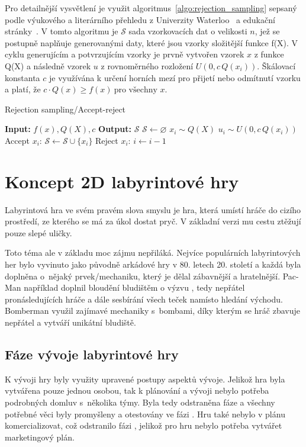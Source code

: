 Pro detailnější vysvětlení je využit algoritmus~\ref{algo:rejection_sampling} sepsaný podle výukového a literárního přehledu z Univerzity Waterloo~\cite{ghojogh2020sampling} a edukační stránky~\cite{Sachdeva_2021}. V tomto algoritmu je $\mathcal{S}$ sada vzorkovacích dat o velikosti $n$, jež se postupně naplňuje generovanými daty, které jsou vzorky složitější funkce f(X). V cyklu generujícím a potvrzujícím vzorky je prvně vytvořen vzorek $x$ z funkce Q(X) a následně vzorek $u$ z rovnoměrného rozložení $U(0, c\, Q(x_i))$. Škálovací konstanta $c$ je využívána k určení horních mezí pro přijetí nebo odmítnutí vzorku a platí, že $c \cdot Q(x) \geq f(x) \ \text{pro všechny } x$.
\label{eq:RA_c}
\begin{algorithm}[h]
\caption{Rejection sampling/Accept-reject}\label{algo:rejection_sampling}
\begin{algorithmic}[1]
    \State \textbf{Input:} $f(x), Q(X), c$\;
    \State \textbf{Output:} $\mathcal{S}$
    \State $\mathcal{S} \gets \varnothing$
        \State $x_i \sim Q(X)$
        \State $u_i \sim U(0, c\, Q(x_i))$
            \State Accept $x_i$: $\mathcal{S} \gets \mathcal{S} \cup \{x_i\}$
        \Else
            \State Reject $x_i$: $i \gets i - 1$
        \EndIf
    \EndFor
\end{algorithmic}
\end{algorithm}

\chapter{Koncept 2D labyrintové hry}\label{chap:Koncept 2D labyrintové hry}
Labyrintová hra ve svém pravém slova smyslu je hra, která umístí hráče do cizího prostředí, ze kterého se má za úkol dostat pryč. V základní verzi mu cestu ztěžují pouze slepé uličky. 

Toto téma ale v základu moc zájmu nepřiláká. Nejvíce populárních labyrintových her bylo vyvinuto jako původně arkádové hry v 80. letech 20. století a každá byla doplněna o~nějaký prvek/mechaniku, který je dělal zábavnější a hratelnější. Pac-Man například doplnil bloudění bludištěm o výzvu , tedy nepřátel pronásledujících hráče a dále sesbírání všech teček namísto hledání východu. Bomberman využil zajímavé mechaniky s~bombami, díky kterým se hráč zbavuje nepřátel a vytváří unikátní bludiště.

\section{Fáze vývoje labyrintové hry}
K vývoji hry byly využity upravené postupy aspektů vývoje. Jelikož hra byla vytvářena pouze jednou osobou, tak k plánování a vývoji nebylo potřeba podrobných domluv s~několika týmy. Byla tedy odstraněna fáze  a všechny potřebné věci byly promyšleny a otestovány ve fázi . Hru také nebylo v plánu komercializovat, což odstranilo fázi , jelikož pro hru nebylo potřeba vytvářet marketingový plán.

